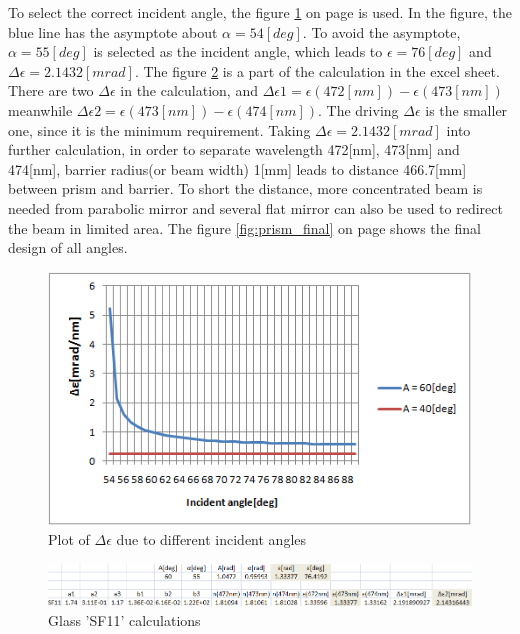 To select the correct incident angle, the figure \ref{fig:prism_alpha} on page \pageref{fig:prism_alpha} is used. In the figure, the blue line has the asymptote about $\alpha = 54[deg]$. To avoid the asymptote, $\alpha = 55[deg]$ is selected as the incident angle, which leads to $\epsilon = 76[deg]$ and $\Delta\epsilon = 2.1432[mrad]$. The figure \ref{fig:SF11} is a part of the calculation in the excel sheet. There are two $\Delta\epsilon$ in the calculation, and $\Delta\epsilon1 = \epsilon(472[nm]) - \epsilon(473[nm])$ meanwhile $\Delta\epsilon2 = \epsilon(473[nm]) - \epsilon(474[nm])$. The driving $\Delta\epsilon$ is the smaller one, since it is the minimum requirement. Taking $\Delta\epsilon = 2.1432[mrad]$ into further calculation, in order to separate wavelength 472[nm], 473[nm] and 474[nm], barrier radius(or beam width) 1[mm] leads to distance 466.7[mm] between prism and barrier. To short the distance, more concentrated beam is needed from parabolic mirror and several flat mirror can also be used to redirect the beam in limited area. The figure \ref{fig:prism_final} on page \pageref{fig:prism_final} shows the final design of all angles.

\begin{figure}[ht!]
\centering
\includegraphics[scale = 1.2]{chapters/img/prism_alpha.png}
\caption{Plot of $\Delta\epsilon$ due to different incident angles}
\label{fig:prism_alpha}
\end{figure}

\begin{figure}[ht!]
\centering
\includegraphics[scale = 0.8]{chapters/img/SF11.png}
\caption{Glass 'SF11' calculations}
\label{fig:SF11}
\end{figure}


